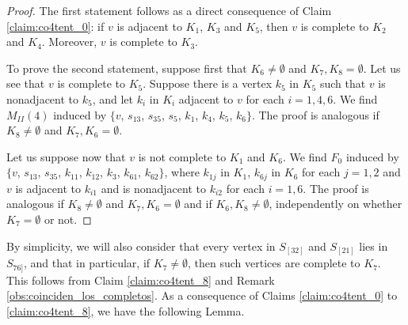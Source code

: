 \documentclass[12pt]{book}
\theoremstyle{plain}
\theoremstyle{remark}
\begin{document}
\begin{proof}
 The first statement follows as a direct consequence of Claim \ref{claim:co4tent_0}: if $v$ is adjacent to $K_1$, $K_3$ and $K_5$, then $v$ is complete to $K_2$ and $K_4$. Moreover, $v$ is complete to $K_3$. 
 

To prove the second statement, suppose first  that $K_6 \neq \emptyset$ and $K_7, K_8 = \emptyset$. Let us see that $v$ is complete to $K_5$. Suppose there is a vertex $k_{5}$ in $K_5$ such that $v$ is nonadjacent to $k_{5}$, and let $k_i$ in $K_i$ adjacent to $v$ for each $i=1,4,6$. We find $M_{II}(4)$ induced by $\{ v$, $s_{13}$, $s_{35}$, $s_5$, $k_1$, $k_4$, $k_5$, $k_6 \}$.  
The proof is analogous if $K_8 \neq \emptyset$ and $K_7, K_6 = \emptyset$.

Let us suppose now that $v$ is not complete to $K_1$ and $K_6$. We find $F_0$ induced by $\{ v$, $s_{13}$, $s_{35}$, $k_{11}$, $k_{12}$, $k_3$, $k_{61}$, $k_{62} \}$, where $k_{1j}$ in $K_1$, $k_{6j}$ in $K_6$ for each $j=1,2$ and $v$ is adjacent to $k_{i1}$ and is nonadjacent to $k_{i2}$ for each $i=1,6$. The proof is analogous if $K_8 \neq \emptyset$ and $K_7, K_6 = \emptyset$ and if $K_6, K_8 \neq \emptyset$, independently on whether $K_7=\emptyset$ or not. 


		

	
\end{proof}

By simplicity, we will also consider that every vertex in $S_{[32]}$ and $S_{[21]}$ lies in $S_{76]}$, and that in particular, if $K_7 \neq \emptyset$, then such vertices are complete to $K_7$. This follows from Claim \ref{claim:co4tent_8} and Remark \ref{obs:coinciden_los_completos}.
As a consequence of Claims \ref{claim:co4tent_0} to \ref{claim:co4tent_8}, we have the following Lemma.
\end{document}
